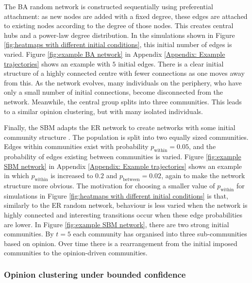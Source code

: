 \documentclass{article}
\begin{document}
The BA random network \cite{barabasi1999emergence} is constructed sequentially using preferential attachment: as new nodes are added with a fixed degree, these edges are attached to existing nodes according to the degree of those nodes. This creates central hubs and a power-law degree distribution. In the simulations shown in Figure \ref{fig:heatmaps with different initial conditions}, this initial number of edges is varied. Figure \ref{fig:example BA network} in Appendix \ref{Appendix: Example trajectories} shows an example with $5$ initial edges. There is a clear initial structure of a highly connected centre with fewer connections as one moves away from this. As the network evolves, many individuals on the periphery, who have only a small number of initial connections, become disconnected from the network. Meanwhile, the central group splits into three communities. This leads to a similar opinion clustering, but with many isolated individuals. 

Finally, the SBM adapts the ER network to create networks with some initial community structure \cite{holland1983stochastic}. The population is split into two equally sized communities. Edges within communities exist with probability $p_{\text{within}} = 0.05$, and the probability of edges existing between communities is varied. Figure \ref{fig:example SBM network} in Appendix \ref{Appendix: Example trajectories} shows an example in which $p_{\text{within}}$ is increased to $0.2$ and $p_\text{between} = 0.02$, again to make the network structure more obvious. The motivation for choosing a smaller value of $p_\text{within}$ for simulations in Figure \ref{fig:heatmaps with different initial conditions} is that, similarly to the ER random network, behaviour is less varied when the network is highly connected and interesting transitions occur when these edge probabilities are lower. In Figure \ref{fig:example SBM network}, there are two strong initial communities. By $t=5$ each community has organised into three sub-communities based on opinion. Over time there is a rearrangement from the initial imposed communities to the opinion-driven communities.  

\subsubsection{Opinion clustering under bounded confidence} \label{Section: Simulations BC}
\end{document}
